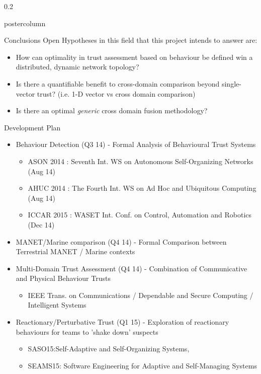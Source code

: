 \documentclass[final,hyperref={pdfpagelabels=false}]{beamer}
\def\colwidth{0.2\linewidth}
\begin{document}
\begin{frame}[fragile]
\begin{columns}[T]
\begin{column}{\colwidth}
\begin{beamercolorbox}[center,wd=\textwidth]{postercolumn}
\begin{minipage}[T]{.98\textwidth}
{\begin{block}{Conclusions}
							Open Hypotheses in this field that this project intends to answer are:
							\begin{itemize}
								\item How can optimality in trust assessment based on behaviour be defined win a distributed, dynamic network topology?
								\item Is there a quantifiable benefit to cross-domain comparison beyond single-vector trust? (i.e. 1-D vector vs cross domain comparison)
								\item Is there an optimal \emph{generic} cross domain fusion methodology?
							\end{itemize}
						\end{block}
						\begin{block}{Development Plan}
							\begin{itemize}
								\item Behaviour Detection (Q3 14) - Formal Analysis of Behavioural Trust Systems
								\begin{itemize}
									\item ASON 2014 : Seventh Int. WS on Autonomous Self-Organizing Networks (Aug 14)
									\item AHUC 2014 : The Fourth Int. WS on Ad Hoc and Ubiquitous Computing (Aug 14)
									\item ICCAR 2015 : WASET Int. Conf. on Control, Automation and Robotics (Dec 14)
								\end{itemize}
								\item MANET/Marine comparison (Q4 14) - Formal Comparison between Terrestrial MANET / Marine contexts
								\item Multi-Domain Trust Assessment (Q4 14) - Combination of Communicative and Physical Behaviour Trusts
								\begin{itemize}
									\item IEEE Trans. on Communications / Dependable and Secure Computing / Intelligent Systems
								\end{itemize}
								\item Reactionary/Perturbative Trust (Q1 15) - Exploration of reactionary behaviours for teams to 'shake down' suspects
								\begin{itemize}
									\item SASO15:Self-Adaptive and Self-Organizing Systems, 
									\item SEAMS15: Software Engineering for Adaptive and Self-Managing Systems
								\end{itemize}
							\end{itemize}
							

\end{block}}
\end{minipage}
\end{beamercolorbox}
\end{column}
\end{columns}
\end{frame}
\end{document}

